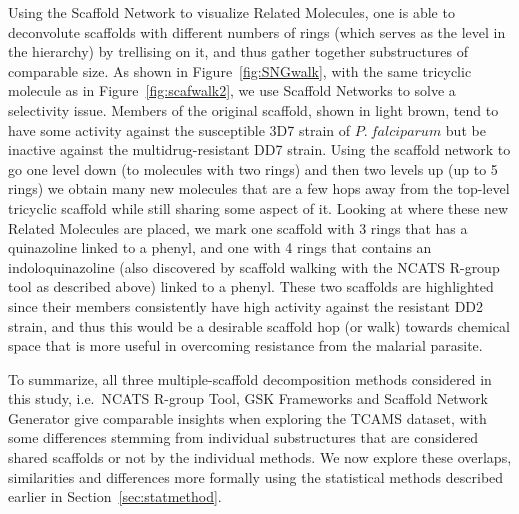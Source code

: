 \documentclass[journal=jacsat,manuscript=article]{achemso}
\newcommand*\fref[1]{Figure~\ref{fig:#1}}
\newcommand*\sref[1]{Section~\ref{sec:#1}}
\newcommand*\ie{i.e.~}
\begin{document}
Using the Scaffold Network to visualize Related Molecules, one is able to deconvolute scaffolds with different numbers of rings (which serves as the level in the hierarchy) by trellising on it, and thus gather together substructures of comparable size. As shown in \fref{SNGwalk}, with the same tricyclic molecule as in \fref{scafwalk2}, we use Scaffold Networks to solve a selectivity issue. Members of the original scaffold, shown in light brown, tend to have some activity against the susceptible 3D7 strain of $P.~falciparum$ but be inactive against the multidrug-resistant DD7 strain. Using the scaffold network to go one level down (to molecules with two rings) and then two levels up (up to 5 rings) we obtain many new molecules that are a few hops away from the top-level tricyclic scaffold while still sharing some aspect of it. Looking at where these new Related Molecules are placed, we mark one scaffold with 3 rings that has a quinazoline linked to a phenyl, and one with 4 rings that contains an indoloquinazoline (also discovered by scaffold walking with the NCATS R-group tool as described above) linked to a phenyl. These two scaffolds are highlighted since their members consistently have high activity against the resistant DD2 strain, and thus this would be a desirable scaffold hop (or walk) towards chemical space that is more useful in overcoming resistance from the malarial parasite.  

To summarize, all three multiple-scaffold decomposition methods considered in this study, \ie NCATS R-group Tool, GSK Frameworks  and Scaffold Network Generator give comparable insights when exploring the TCAMS dataset, with some differences stemming from individual substructures that are considered shared scaffolds or not by the individual methods.  We now explore these overlaps, similarities and differences more formally using the statistical methods described earlier in \sref{statmethod}.
\end{document}
